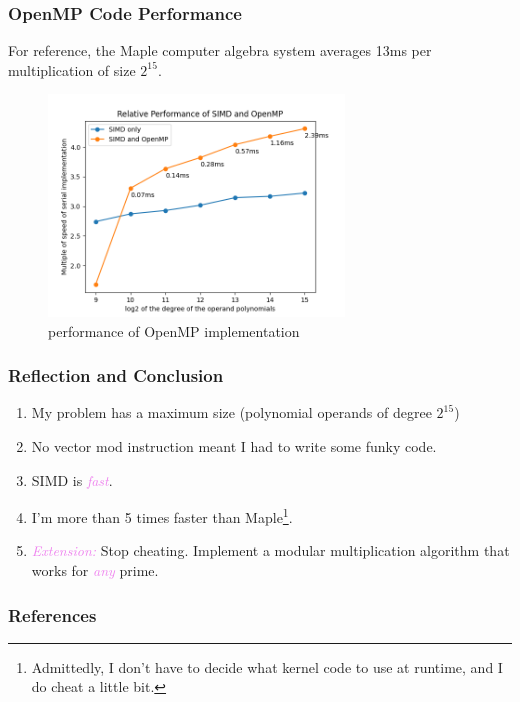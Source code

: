 \documentclass{beamer}
\newcommand{\its}[1]{\textcolor{violet}{\emph{#1}}}
\begin{document}
\begin{frame}
    \frametitle{OpenMP Code Performance}

    For reference, the Maple computer algebra system averages 13ms per
    multiplication of size $2^{15}$.

    \vfill

    \begin{figure}
        \centering
        \includegraphics[width=0.7\textwidth]{omp_perf.png}
        \caption{performance of OpenMP implementation}
    \end{figure}

\end{frame}

\begin{frame}
    \frametitle{Reflection and Conclusion}

    \begin{enumerate}[label=(\roman*)]
        \item My problem has a maximum size (polynomial operands of degree
            $2^{15}$) \pause \medbreak

        \item No vector mod instruction meant I had to write some funky code.
            \pause \medbreak

        \item SIMD is \its{fast}. \pause \medbreak

        \item I'm more than 5 times faster than Maple\footnote<4->{
                Admittedly, I don't have to decide what kernel code to use at
                runtime, and I do cheat a little bit.
            }. \pause \medbreak

        \item \its{Extension:} Stop cheating. Implement a modular multiplication
            algorithm that works for \its{any} prime.
    \end{enumerate}
\end{frame}

\begin{frame}
    \frametitle{References}

    
    
\end{frame}
\end{document}
